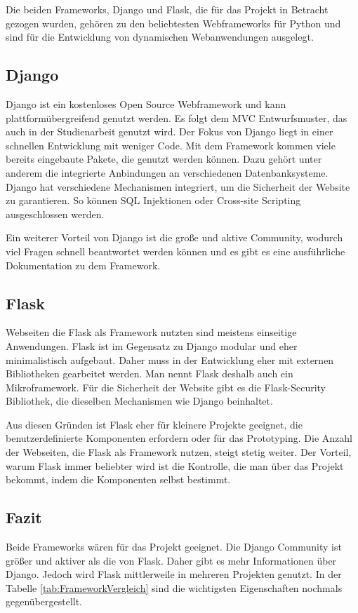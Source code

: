 Die beiden Frameworks, Django und Flask, die für das Projekt in Betracht gezogen wurden, gehören zu den beliebtesten Webframeworks für Python und sind für die Entwicklung von dynamischen Webanwendungen ausgelegt. 

\subsection{Django}
Django ist ein kostenloses Open Source Webframework und kann plattformübergreifend genutzt werden. Es folgt dem \ac{MVC} Entwurfsmuster, das auch in der Studienarbeit genutzt wird. Der Fokus von Django liegt in einer schnellen Entwicklung mit weniger Code. Mit dem Framework kommen viele bereits eingebaute Pakete, die genutzt werden können. Dazu gehört unter anderem die integrierte Anbindungen an verschiedenen Datenbanksysteme. Django hat verschiedene Mechanismen integriert, um die Sicherheit der Website zu garantieren. So können SQL Injektionen oder Cross-site Scripting ausgeschlossen werden.

Ein weiterer Vorteil von Django ist die große und aktive Community, wodurch viel Fragen schnell beantwortet werden können und es gibt es eine ausführliche Dokumentation zu dem Framework. 

\subsection{Flask}
Webseiten die Flask als Framework nutzten sind meistens einseitige Anwendungen. Flask ist im Gegensatz zu Django modular und eher minimalistisch aufgebaut. Daher muss in der Entwicklung eher mit externen Bibliotheken gearbeitet werden. Man nennt Flask deshalb auch ein Mikroframework. Für die Sicherheit der Website gibt es die Flask-Security Bibliothek, die dieselben Mechanismen wie Django beinhaltet.

Aus diesen Gründen ist Flask eher für kleinere Projekte geeignet, die benutzerdefinierte Komponenten erfordern oder für das Prototyping. Die Anzahl der Webseiten, die Flask als Framework nutzen, steigt stetig weiter. Der Vorteil, warum Flask immer beliebter wird ist die Kontrolle, die man über das Projekt bekommt, indem die Komponenten selbst bestimmt.

\subsection{Fazit}
Beide Frameworks wären für das Projekt geeignet. Die Django Community ist größer und aktiver als die von Flask. Daher gibt es mehr Informationen über Django. Jedoch wird Flask mittlerweile in mehreren Projekten genutzt. In der Tabelle \ref{tab:FrameworkVergleich} sind die wichtigsten Eigenschaften nochmals gegenübergestellt. 

